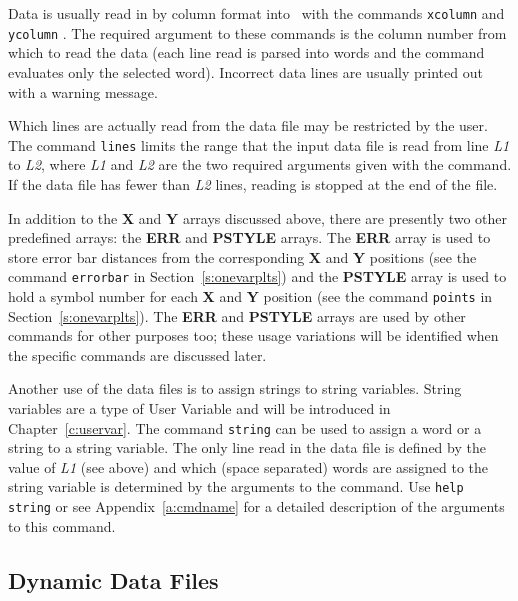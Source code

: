 Data is usually read in by column format into \wip\ with the commands
{\tt xcolumn}%
and
{\tt ycolumn}%
.
The required argument to these commands is the column number from which
to read the data
(\ie each line read is parsed into words and the command
evaluates only the selected word).
Incorrect data lines are usually printed out with a warning message.

Which lines are actually read from the data file may be restricted by the user.
The command 
{\tt lines}
limits the range that the input data file is read from line {\em L1} to
{\em L2}, where {\em L1} and {\em L2} are the two required
arguments given with the command.
If the data file has fewer than {\em L2\/} lines, reading is stopped at
the end of the file.

In addition to the {\bf X} and {\bf Y} arrays discussed above,
there are presently two other predefined arrays:
the {\bf ERR} and {\bf PSTYLE} arrays.
The {\bf ERR} array is used to store error bar distances from the corresponding
{\bf X} and {\bf Y} positions
(see the command {\tt errorbar} in Section~\ref{s:onevarplts})
and
the {\bf PSTYLE} array is used to hold a symbol number for
each {\bf X} and {\bf Y} position
(see the command {\tt points} in Section~\ref{s:onevarplts}).
The {\bf ERR} and {\bf PSTYLE} arrays are used by other commands for other
purposes too; these usage variations will be identified when the
specific commands are discussed later.

Another use of the data files is to assign strings to
string variables.
String variables are a type of User Variable
and will be introduced in Chapter~\ref{c:uservar}.
The command {\tt string}
can be used to assign a word or a string to a string variable.
The only line read in the data file is defined by the value of
{\em L1} (see above) and which (space separated) words are assigned to
the string variable is determined by the arguments to the command.
Use {\tt help string}
or see Appendix~\ref{a:cmdname}
for a detailed description of the arguments to this command.

\subsection*{Dynamic Data Files}


